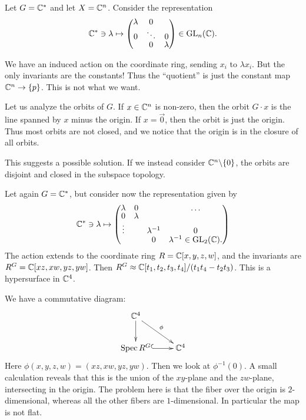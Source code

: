 \documentclass[11pt, english]{article}
\begin{document}
\begin{example}
  Let $G = \mathbb{C}^\ast$ and let $X = \mathbb{C}^n$. Consider the representation
$$
\C^\ast \ni \lambda \mapsto 
\begin{pmatrix}
  \lambda & 0 & \\
0 & \ddots &0 \\
&0 & \lambda
\end{pmatrix} \in \GL_n(\C).
$$

We have an induced action on the coordinate ring, sending $x_i$ to $\lambda x_i$. But the only invariants are the constants! Thus the ``quotient'' is just the constant map $\mathbb{C}^n \to \{p\}$. This is not what we want.

Let us analyze the orbits of $G$. If $x \in \mathbb{C}^n$ is non-zero, then the orbit $G \cdot x$ is the line spanned by $x$ minus the origin. If $x=\vec 0$, then the orbit is just the origin. Thus most orbits are not closed, and we notice that the origin is in the closure of all orbits. 

This suggests a possible solution. If we instead consider $\mathbb{C}^n \backslash \{ 0\}$, the orbits are disjoint and closed in the subspace topology.
\end{example}

\begin{example}
Let again $G = \mathbb{C}^\ast$, but consider now the representation given by
$$
\C^\ast \ni \lambda \mapsto 
\begingroup
\renewcommand*{\arraystretch}{0.8}
\begin{pmatrix}
  \lambda & 0& & \ldots \\
0& \lambda & & \\
\vdots & & \lambda^{-1} &0 \\
&&0& \lambda^{-1}  \in \GL_2(\C).
\end{pmatrix}
\endgroup
$$
The action extends to the coordinate ring $R= \mathbb{C}[x,y,z,w]$, and the invariants are $R^G=\mathbb{C}[xz,xw,yz,yw]$. Then $R^G \approx \mathbb{C}[t_1,t_2,t_3,t_4]/(t_1t_4-t_2t_3)$. This is a hypersurface in $\mathbb{C}^4$. 

We have a commutative diagram:
\[
\xymatrix{
\C^4 \ar[d] \ar[dr]^\phi & \\
\Spec R^G \ar@{^(->}[r] & \C^4
}
\]
Here $\phi(x,y,z,w)=(xz,xw,yz,yw)$. Then we look at $\phi^{-1}(0)$. A small calculation reveals that this is the union of the $xy$-plane and the $zw$-plane, intersecting in the origin. The problem here is that the fiber over the origin is $2$-dimensional, whereas all the other fibers are $1$-dimensional. In particular the map is not flat.
\end{example}
\end{document}
